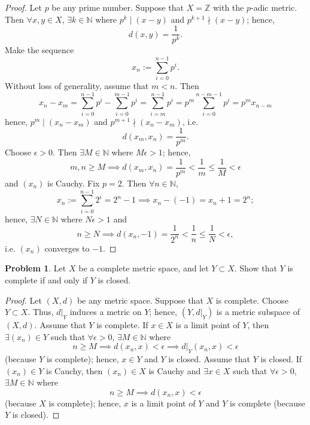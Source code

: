 \documentclass{amsart}
\theoremstyle{definition}
\newtheorem{problem}{Problem}
\begin{document}
\begin{proof}
    Let $p$ be any prime number. Suppose that $X = \mathbb{Z}$ with the $p$-adic metric. Then $\forall x,y \in X$, $\exists k \in \mathbb{N}$ where $p^{k} \mid (x-y)$ and $p^{k+1} \nmid (x-y)$; hence,
    \[
    d(x,y) = \frac{1}{p^k}.
    \]
    Make the sequence
    \[
    x_n := \sum_{i = 0}^{n-1}p^i.
    \]
    Without loss of generality, assume that $m < n$. Then 
    \[
    x_n - x_m = \sum_{i = 0}^{n-1}p^i - \sum_{i = 0}^{m-1}p^i = \sum_{i = m}^{n-1}p^i = p^m\sum_{i = 0}^{n-m-1}p^i = p^mx_{n-m}
    \]
    hence, $p^m \mid (x_n - x_m)$ and $p^{m+1} \nmid (x_n - x_m)$, i.e.
    \[
    d(x_m,x_n) = \frac{1}{p^m}.
    \]
    Choose $\epsilon > 0$. Then $\exists M \in \mathbb{N}$ where $M\epsilon > 1$; hence,
    \[
    m,n \geq M \implies d(x_m,x_n) = \frac{1}{p^m} < \frac{1}{m} \leq \frac{1}{M} < \epsilon
    \]
    and $(x_n)$ is Cauchy. Fix $p = 2$. Then $\forall n \in \mathbb{N}$, 
    \[
    x_n := \sum_{i = 0}^{n-1}2^i = 2^n - 1 \implies x_n - (-1) = x_n + 1 = 2^n; 
    \]
    hence, $\exists N \in \mathbb{N}$ where $N\epsilon > 1$ and 
    \[
    n \geq N \implies d(x_n,-1) = \frac{1}{2^n} < \frac{1}{n} \leq \frac{1}{N} < \epsilon,
    \]
    i.e. $(x_n)$ converges to $-1$.
\end{proof}

\begin{problem}
    Let $X$ be a complete metric space, and let $Y \subset X$. Show that $Y$ is complete if and only if $Y$ is closed.
\end{problem}

\begin{proof}
    Let $(X,d)$ be any metric space. Suppose that $X$ is complete. Choose $Y \subset X$. Thus, $d\vert_Y$ induces a metric on $Y$; hence, $(Y,d\vert_Y)$ is a metric subspace of $(X,d)$. Assume that $Y$ is complete. If $x \in X$ is a limit point of $Y$, then $\exists (x_n) \in Y$ such that $\forall \epsilon > 0$, $\exists M \in \mathbb{N}$ where
    \[
    n \geq M \implies d(x_n,x) < \epsilon \implies d\vert_Y(x_n,x) < \epsilon
    \]
    (because $Y$ is complete); hence, $x \in Y$ and $Y$ is closed. Assume that $Y$ is closed. If $(x_n) \in Y$ is Cauchy, then $(x_n) \in X$ is Cauchy and $\exists x \in X$ such that $\forall \epsilon > 0$, $\exists M \in \mathbb{N}$ where
    \[
    n \geq M \implies d(x_n,x) < \epsilon
    \]
    (because $X$ is complete); hence, $x$ is a limit point of $Y$ and $Y$ is complete (because $Y$ is closed).
\end{proof}
\end{document}
